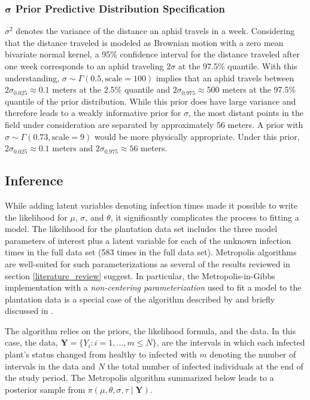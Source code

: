 \documentclass{uwstat572}
\begin{document}
\subsubsection{$\boldsymbol{\sigma}$ Prior Predictive Distribution Specification}
$\sigma^2$ denotes the variance of the distance an aphid travels in a week. 
Considering that the distance traveled is modeled as Brownian motion with a zero mean bivariate normal kernel, a 95\% confidence interval for the distance traveled after one week corresponds to an aphid traveling $2\sigma$ at the 97.5\% quantile. 
With this understanding, $\sigma \sim \Gamma(0.5, \text{scale}=100)$ implies that an aphid travels between $2\sigma_{0.025} \approx 0.1$ meters at the 2.5\% quantile and $2\sigma_{0.975} \approx 500$ meters at the 97.5\% quantile of the prior distribution. 
While this prior does have large variance and therefore leads to a weakly informative prior for $\sigma$, the most distant points in the field under consideration are separated by approximately 56 meters. 
A prior with $\sigma \sim \Gamma(0.73, \text{scale}=9)$ would be more physically appropriate. 
Under this prior, $2\sigma_{0.025} \approx 0.1$ meters and $2\sigma_{0.975} \approx 56$ meters. 

\subsection{Inference}
\label{inference}
While adding latent variables denoting infection times made it possible to write the likelihood for $\mu$, $\sigma$, and $\theta$, it significantly complicates the process to fitting a model. 
The likelihood for the plantation data set includes the three model parameters of interest plus a latent variable for each of the unknown infection times in the full data set (583 times in the full data set). 
Metropolis algorithms are well-suited for such parameterizations as several of the results reviewed in section \ref{literature_review} suggest.  
In particular, the Metropolis-in-Gibbs implementation with a \textit{non-centering parameterization} used to fit a model to the plantation data is a special case of the algorithm described by \citet{Jewell} and briefly discussed in \citet{ONeill}.  

The algorithm relies on the priors, the likelihood formula, and the data. 
In this case, the data, $\textbf{Y} = \{Y_i:i=1,\dots, m \le N\}$, are the intervals in which each infected plant's status changed from healthy to infected with $m$ denoting the number of intervals in the data and $N$ the total number of infected individuals at the end of the study period. 
The Metropolis algorithm summarized below leads to a posterior sample from $\pi(\mu, \theta, \sigma, \tau \mid \textbf{Y})$. 
\end{document}
